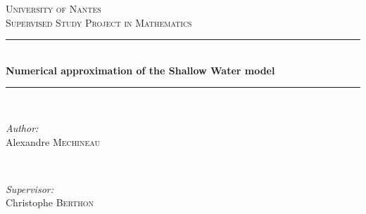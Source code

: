 \begin{titlepage}

\newcommand{\HRule}{\rule{\linewidth}{0.5mm}} %

\center %
 

\textsc{\LARGE University of Nantes}\\[1.5cm] %
\textsc{\Large Supervised Study Project in Mathematics}\\[0.5cm] %


\HRule \\[0.4cm]
{ \huge \bfseries Numerical approximation of the Shallow Water model}\\[0.4cm] %
\HRule \\[1.5cm]
 

\begin{minipage}{0.4\textwidth}
\begin{flushleft} \large
\emph{Author:}\\
Alexandre \textsc{Mechineau} %
\end{flushleft}
\end{minipage}
~
\begin{minipage}{0.4\textwidth}
\begin{flushright} \large
\emph{Supervisor:} \\

Christophe \textsc{Berthon} %
\end{flushright}
\end{minipage}\\[2cm]



\end{titlepage}
